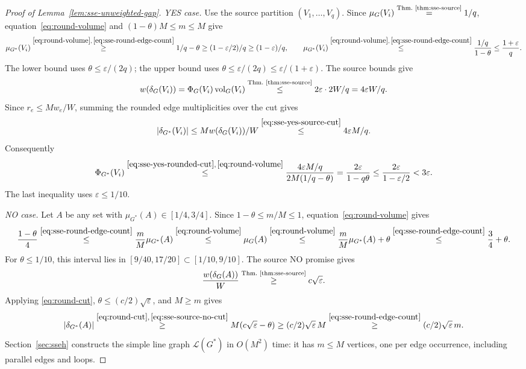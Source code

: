 \begin{proof}[Proof of Lemma~\ref{lem:sse-unweighted-gap}]
\emph{YES case.}
Use the source partition $(V_1,\ldots,V_q)$.
Since $\mu_G(V_i)\overset{\text{Thm.~\ref{thm:sse-source}}}{=}1/q$,
equation~\eqref{eq:round-volume} and
$(1-\theta)M\leq m\leq M$ give
\[
\mu_{G^*}(V_i)
 \overset{\eqref{eq:round-volume},\,\eqref{eq:sse-round-edge-count}}{\geq}
 1/q-\theta
 \geq(1-\varepsilon/2)/q
 \geq(1-\varepsilon)/q,\qquad \mu_{G^*}(V_i)
 \overset{\eqref{eq:round-volume},\,\eqref{eq:sse-round-edge-count}}{\leq}
 \frac{1/q}{1-\theta}
 \leq\frac{1+\varepsilon}{q}.
\]
The lower bound uses $\theta\leq\varepsilon/(2q)$; the upper bound
uses $\theta\leq\varepsilon/(2q)\leq\varepsilon/(1+\varepsilon)$.
The source bounds give
\begin{equation}\label{eq:sse-yes-source-cut}
 w(\delta_G(V_i))=\Phi_G(V_i)\operatorname{vol}_G(V_i)
 \overset{\text{Thm.~\ref{thm:sse-source}}}{\leq}
 2\varepsilon\cdot2W/q=4\varepsilon W/q.
\end{equation}
Since $r_e\leq Mw_e/W$, summing the rounded edge multiplicities over
the cut gives
\begin{equation}\label{eq:sse-yes-rounded-cut}
 |\delta_{G^*}(V_i)|\leq Mw(\delta_G(V_i))/W
 \overset{\eqref{eq:sse-yes-source-cut}}{\leq}4\varepsilon M/q.
\end{equation}
Consequently
\[
\Phi_{G^*}(V_i)
  \overset{\eqref{eq:sse-yes-rounded-cut},\,\eqref{eq:round-volume}}{\leq}
  \frac{4\varepsilon M/q}{2M(1/q-\theta)}
  =\frac{2\varepsilon}{1-q\theta}
 \leq\frac{2\varepsilon}{1-\varepsilon/2}
  <3\varepsilon.
\]
The last inequality uses $\varepsilon\le1/10$.

\emph{NO case.}
Let $A$ be any set with
$\mu_{G^*}(A)\in[1/4,3/4]$. Since $1-\theta\leq m/M\leq1$,
equation~\eqref{eq:round-volume} gives
\[
 \frac{1-\theta}{4}
 \overset{\eqref{eq:sse-round-edge-count}}{\leq}\frac{m}{M}\mu_{G^*}(A)
 \overset{\eqref{eq:round-volume}}{\leq}\mu_G(A)
 \overset{\eqref{eq:round-volume}}{\leq}\frac{m}{M}\mu_{G^*}(A)+\theta
 \overset{\eqref{eq:sse-round-edge-count}}{\leq}\frac34+\theta.
\]
For $\theta\le1/10$, this interval lies in
$[9/40,17/20]\subset[1/10,9/10]$. The source NO promise gives
\begin{equation}\label{eq:sse-source-no-cut}
 \frac{w(\delta_G(A))}{W}
 \overset{\text{Thm.~\ref{thm:sse-source}}}{\geq}c\sqrt{\varepsilon}.
\end{equation}
Applying
\eqref{eq:round-cut}, $\theta\leq(c/2)\sqrt\varepsilon$, and $M\geq m$ gives
\[
  |\delta_{G^*}(A)|
  \overset{\eqref{eq:round-cut},\,\eqref{eq:sse-source-no-cut}}{\geq}
  M(c\sqrt\varepsilon-\theta)
  \geq(c/2)\sqrt\varepsilon\,M
  \overset{\eqref{eq:sse-round-edge-count}}{\geq}(c/2)\sqrt\varepsilon\,m.
\]
Section~\ref{sec:sseh} constructs the simple line graph
$\mathcal L(G^*)$ in $O(M^2)$ time: it has $m\leq M$ vertices,
one per edge occurrence, including parallel edges and loops.
\end{proof}

